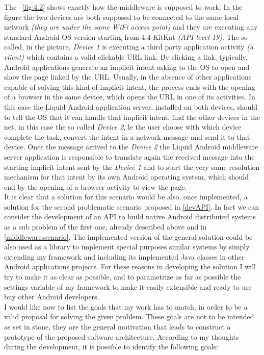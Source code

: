 The \figurename~\ref{fig:4.2} shows exactly how the middleware is supposed to work. In the figure the two devices are both supposed to be connected to the same local network \textit{(they are under the same WiFi access point)} and they are executing any standard Android OS version starting from 4.4 KitKat \textit{(API level 19)}. The so called, in the picture, \textit{Device 1} is executing a third party application activity \textit{(a client)}  which contains a valid clickable URL link. By clicking a link, typically, Android applications generate an implicit intent asking to the OS to open and show the page linked by the URL. Usually, in the absence of other applications capable of solving this kind of implicit intent, the process ends with the opening of a browser in the same device, which opens the URL in one of its activities. In this case the Liquid Android application server, installed on both devices, should to tell the OS that it can handle that implicit intent, find the other devices in the net, in this case the so called \textit{Device 2}, le the user choose with which device complete the task, convert the intent in a network message and send it to that device. Once the message arrived to the \textit{Device 2} the Liquid Android middleware server application is responsible to translate again the received message into the starting implicit intent sent by the \textit{Device 1} and to start the very same resolution mechanism for that intent by its own Android operating system, which should end by the opening of a browser activity to view the page.\\
It is clear that a solution for this scenario would be also, once implemented, a solution for the second problematic scenario proposed in \ref{devAPI}. In fact we can consider the development of an API to build native Android distributed systems as a sub problem of the first one, already described above and in \ref{middlewarescenario}. The implemented version of the general solution could be also used as a library to implement special purposes similar systems by simply extending my framework and including its implemented Java classes in other Android applications projects. For these reasons in developing the solution I will try to make it as clear as possible, and to parametrize as far as possible the settings variable of my framework to make it easily extensible and ready to use buy other Android developers.\\
I would like now to list the goals that my work has to match, in order to be a valid proposal for solving the given problem. These goals are not to be intended as set in stone, they are the general motivation that leads to construct a prototype of the proposed software architecture. According to my thoughts during the development, it is possible to identify the following goals:
